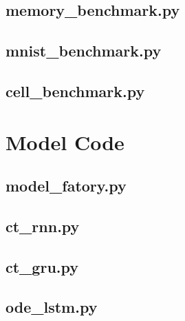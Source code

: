 \documentclass[draft,final]{vutinfth} %
\begin{document}
    \subsection{memory\_benchmark.py}
    

    \subsection{mnist\_benchmark.py}
    

    \subsection{cell\_benchmark.py}
    


    \section{Model Code}

    \subsection{model\_fatory.py}
    

    \subsection{ct\_rnn.py}
    

    \subsection{ct\_gru.py}
    

    \subsection{ode\_lstm.py}
    
\end{document}
